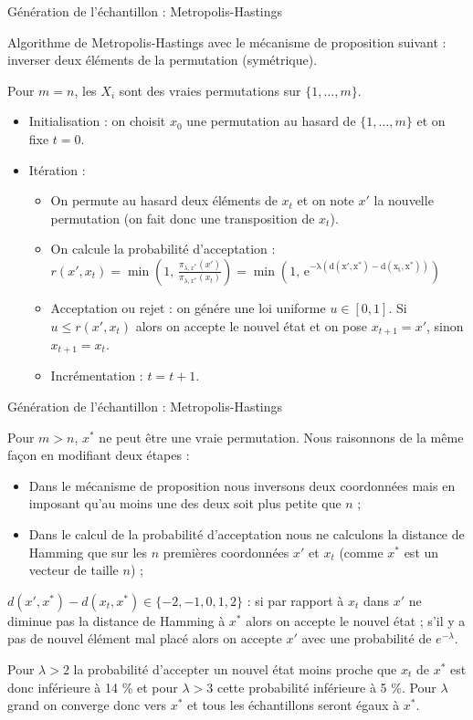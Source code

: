 \documentclass[10pt,xcolor=table,color={dvipsnames,usenames},ignorenonframetext,usepdftitle=false,french]{beamer}
\begin{document}
\begin{frame}{Génération de l'échantillon : Metropolis-Hastings}

Algorithme de Metropolis-Hastings avec le mécanisme de proposition
suivant : inverser deux éléments de la permutation (symétrique).

Pour \(m=n\), les \(X_i\) sont des vraies permutations sur
\(\{1,\dots,m\}\).

\begin{itemize}
\item Initialisation : on choisit $x_0$ une permutation au hasard de $\{1,\dots,m\}$ et on fixe $t=0$.
\item Itération : 
\begin{itemize}
\item On permute au hasard deux éléments de $x_t$ et on note $x'$ la nouvelle permutation (on fait donc une transposition de $x_t$).
\item On calcule la probabilité d'acceptation : $r(x',x_t)=\min\left(1,\,\frac{\pi_{\lambda,x^*}(x')}{\pi_{\lambda,x^*}(x_{t})}\right)
=\min\left(1,\,\mathrm{e^{-\lambda(d(x',x^{*})-d(x_{t},x^{*}))}}\right)$
\item Acceptation ou rejet : on génére une loi uniforme $u\in[0,1]$. Si $u \leq r(x',x_{t}) $ alors on accepte le nouvel état et on pose $x_{t+1}=x'$, sinon $x_{t+1}=x_{t}$.
\item Incrémentation : $t=t+1$.
\end{itemize}
\end{itemize}

\end{frame}

\begin{frame}{Génération de l'échantillon : Metropolis-Hastings}

Pour \(m>n\), \(x^*\) ne peut être une vraie permutation. Nous
raisonnons de la même façon en modifiant deux étapes :

\begin{itemize}
\item Dans le mécanisme de proposition nous inversons deux coordonnées mais en imposant qu'au moins une des deux soit plus petite que $n$ ;
\item Dans le calcul de la probabilité d'acceptation nous ne calculons la distance de Hamming que sur les $n$ premières coordonnées $x'$ et $x_t$ (comme $x^*$ est un vecteur de taille $n$) ;
\end{itemize}

\(d(x',x^{*})-d(x_{t},x^{*})\in\{-2,-1,0,1,2\}\) : si par rapport à
\(x_t\) dans \(x'\) ne diminue pas la distance de Hamming à \(x^{*}\)
alors on accepte le nouvel état ; s'il y a pas de nouvel élément mal
placé alors on accepte \(x'\) avec une probabilité de \(e^{-\lambda}\).

Pour \(\lambda>2\) la probabilité d'accepter un nouvel état moins proche
que \(x_t\) de \(x^*\) est donc inférieure à 14 \% et pour \(\lambda>3\)
cette probabilité inférieure à 5 \%. Pour \(\lambda\) grand on converge
donc vers \(x^*\) et tous les échantillons seront égaux à \(x^*\).

\end{frame}
\end{document}
